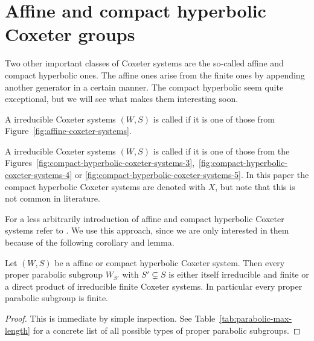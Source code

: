 \section{Affine and compact hyperbolic Coxeter groups}
\label{sec:coxeter-groups-affine-compact-hyperbolic}

Two other important classes of Coxeter systems are the so-called affine and compact hyperbolic ones. The affine ones arise from the finite ones by appending another generator in a certain manner. The compact hyperbolic seem quite exceptional, but we will see what makes them interesting soon.

\begin{defi}
	A irreducible Coxeter systems $(W,S)$ is called  if it is one of those from Figure~\ref{fig:affine-coxeter-systems}.
\end{defi}

\begin{defi}
	A irreducible Coxeter systems $(W,S)$ is called  if it is one of those from the Figures~\ref{fig:compact-hyperbolic-coxeter-systems-3},~\ref{fig:compact-hyperbolic-coxeter-systems-4} or \ref{fig:compact-hyperbolic-coxeter-systems-5}. In this paper the compact hyperbolic Coxeter systems are denoted with $X$, but note that this is not common in literature.
\end{defi}

For a less arbitrarily introduction of affine and compact hyperbolic Coxeter systems refer to \cite[Section 2.5, 6.7 -- 6.9]{humphreys:coxeter}. We use this approach, since we are only interested in them because of the following corollary and lemma.

\begin{coro}
	Let $(W,S)$ be a affine or compact hyperbolic Coxeter system. Then every proper parabolic subgroup $W_{S'}$ with $S' \subsetneq S$ is either itself irreducible and finite or a direct product of irreducible finite Coxeter systems. In particular every proper parabolic subgroup is finite.

	\begin{proof}
		This is immediate by simple inspection. See Table~\ref{tab:parabolic-max-length} for a concrete list of all possible types of proper parabolic subgroups.
	\end{proof}
\end{coro}

